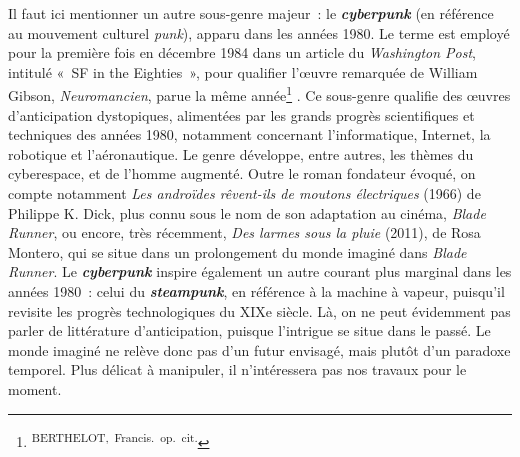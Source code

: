 \documentclass[letterpaper,portrait,12pt]{article}
\begin{document}
	Il faut ici mentionner un autre sous-genre majeur : le \textbf{\emph{cyberpunk}} (en r\'{e}f\'{e}rence au mouvement culturel \emph{punk}), apparu dans les ann\'{e}es 1980. Le terme est employ\'{e} pour la premi\`{e}re fois en d\'{e}cembre 1984 dans un article du \emph{Washington Post}, intitul\'{e} « SF in the Eighties », pour qualifier l'\oe{}uvre remarqu\'{e}e de William Gibson,\emph{ Neuromancien}, parue la m\^{e}me ann\'{e}e\footnote{\textsuperscript{\newpage
}\textsuperscript{	BERTHELOT,\ Francis.\ op.\ cit.}} . Ce sous-genre qualifie des \oe{}uvres d'anticipation dystopiques, aliment\'{e}es par les grands progr\`{e}s scientifiques et techniques des ann\'{e}es 1980, notamment concernant l'informatique, Internet, la robotique et l'a\'{e}ronautique. Le genre d\'{e}veloppe, entre autres, les th\`{e}mes du cyberespace, et de l'homme augment\'{e}. Outre le roman fondateur \'{e}voqu\'{e}, on compte notamment \emph{Les androïdes r\^{e}vent-ils de moutons \'{e}lectriques }(1966) de Philippe K. Dick, plus connu sous le nom de son adaptation au cin\'{e}ma, \emph{Blade Runner}, ou encore, tr\`{e}s r\'{e}cemment, \emph{Des larmes sous la pluie} (2011), de Rosa Montero, qui se situe dans un prolongement du monde imagin\'{e} dans \emph{Blade Runner}. Le \textbf{\emph{cyberpunk}} inspire \'{e}galement un autre courant plus marginal dans les ann\'{e}es 1980 : celui du\textbf{\emph{ steampunk}}, en r\'{e}f\'{e}rence \`{a} la machine \`{a} vapeur, puisqu'il revisite les progr\`{e}s technologiques du XIXe si\`{e}cle. L\`{a}, on ne peut \'{e}videmment pas parler de litt\'{e}rature d'anticipation, puisque l'intrigue se situe dans le pass\'{e}. Le monde imagin\'{e} ne rel\`{e}ve donc pas d'un futur envisag\'{e}, mais plut\^{o}t d'un paradoxe temporel. Plus d\'{e}licat \`{a} manipuler, il n'int\'{e}ressera pas nos travaux pour le moment.
\end{document}
